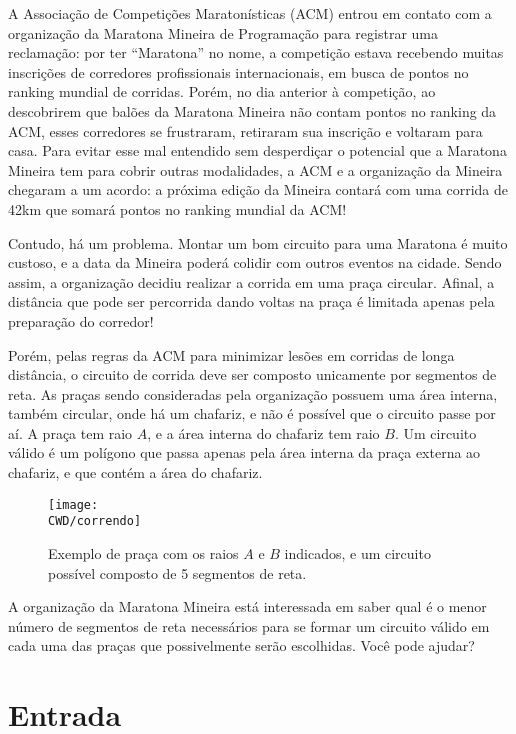 A Associação de Competições Maratonísticas (ACM) entrou em contato com a organização da Maratona Mineira de Programação para registrar uma reclamação:
por ter ``Maratona'' no nome, a competição estava recebendo muitas inscrições de corredores profissionais internacionais, em busca de pontos no
ranking mundial de corridas. Porém, no dia anterior à competição,
ao descobrirem que balões da Maratona Mineira não contam pontos no ranking da ACM, esses corredores se frustraram, retiraram
sua inscrição e voltaram para casa.
Para evitar esse mal entendido sem desperdiçar o potencial que a Maratona Mineira tem para cobrir outras modalidades,
a ACM e a organização da Mineira chegaram
a um acordo: a próxima edição da Mineira contará com uma corrida de 42km que somará pontos no ranking mundial da ACM!

Contudo, há um problema. Montar um bom circuito para uma Maratona é muito custoso, e a data da Mineira poderá colidir
com outros eventos na cidade. Sendo assim, a organização decidiu realizar a corrida em uma praça circular. Afinal, a distância que
pode ser percorrida dando voltas na praça é limitada apenas pela preparação do corredor!

Porém, pelas regras da ACM para minimizar lesões em corridas de longa distância, o circuito de corrida deve ser composto
unicamente por segmentos de reta.
As praças sendo consideradas pela organização possuem uma área interna, também circular, onde há um chafariz, e não é possível que o circuito
passe por aí. A praça tem raio $A$, e a área interna do chafariz tem raio $B$. Um circuito válido é um polígono que passa apenas pela área interna
da praça externa ao chafariz, e que contém a área do chafariz.

\begin{figure}[h]
\begin{center}
\texttt{[image: \\CWD/correndo]}
\begin{quote}
\caption{Exemplo de praça com os raios $A$ e $B$ indicados, e um circuito possível composto de 5 segmentos de reta.}
\end{quote}
\end{center}
\end{figure}

A organização da Maratona Mineira está interessada em saber qual é o menor número de segmentos de reta necessários para se formar um circuito
válido em cada uma das praças que possivelmente serão escolhidas. Você pode ajudar?

\section*{Entrada}

